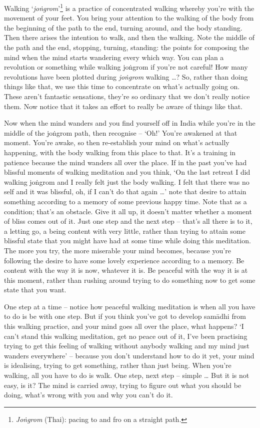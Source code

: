 
Walking `\textit{joṅgrom}'\footnote{\textit{Joṅgrom} (Thai): pacing to and fro on a straight path.} is a practice of concentrated walking whereby you're with the movement of your feet. You bring your attention to the walking of the body from the beginning of the path to the end, turning around, and the body standing. Then there arises the intention to walk, and then the walking. Note the middle of the path and the end, stopping, turning, standing: the points for composing the mind when the mind starts wandering every which way. You can plan a revolution or something while walking joṅgrom if you're not careful! How many revolutions have been plotted during \textit{joṅgrom} walking \ldots{}? So, rather than doing things like that, we use this time to concentrate on what's actually going on. These aren't fantastic sensations, they're so ordinary that we don't really notice them. Now notice that it takes an effort to really be aware of things like that.

Now when the mind wanders and you find yourself off in India while you're in the middle of the joṅgrom path, then recognise -- `Oh!' You're awakened at that moment. You're awake, so then re-establish your mind on what's actually happening, with the body walking from this place to that. It's a training in patience because the mind wanders all over the place. If in the past you've had blissful moments of walking meditation and you think, `On the last retreat I did walking joṅgrom and I really felt just the body walking. I felt that there was no self and it was blissful, oh, if I can't do that again \ldots{}' note that desire to attain something according to a memory of some previous happy time. Note that as a condition; that's an obstacle. Give it all up, it doesn't matter whether a moment of bliss comes out of it. Just one step and the next step -- that's all there is to it, a letting go, a being content with very little, rather than trying to attain some blissful state that you might have had at some time while doing this meditation. The more you try, the more miserable your mind becomes, because you're following the desire to have some lovely experience according to a memory. Be content with the way it is now, whatever it is. Be peaceful with the way it is at this moment, rather than rushing around trying to do something now to get some state that you want.

One step at a time -- notice how peaceful walking meditation is when all you have to do is be with one step. But if you think you've got to develop samādhi from this walking practice, and your mind goes all over the place, what happens? `I can't stand this walking meditation, get no peace out of it, I've been practising trying to get this feeling of walking without anybody walking and my mind just wanders everywhere' -- because you don't understand how to do it yet, your mind is idealising, trying to get something, rather than just being. When you're walking, all you have to do is walk. One step, next step -- simple \ldots{} But it is not easy, is it? The mind is carried away, trying to figure out what you should be doing, what's wrong with you and why you can't do it.

